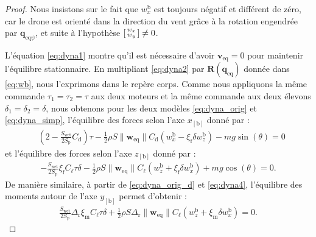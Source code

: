 \begin{proof}
        Nous insistons sur le fait que $w_{x}^{\text{b}}$ est toujours négatif et différent de zéro, car le drone est orienté dans la direction du vent grâce à la rotation engendrée par $ \boldsymbol{q}_{\mathrm{eq}\psi}$, et suite à l'hypothèse $\left[ \begin{smallmatrix}w_x \\ w_y \end{smallmatrix} \right] \neq 0$.
    
        L'équation \eqref{eq:dyna1} montre qu'il est nécessaire d'avoir $\boldsymbol{v}_{\text{eq}} = 0$ pour maintenir l'équilibre stationnaire. En multipliant \eqref{eq:dyna2} par $\boldsymbol{R}(\boldsymbol{q}_{\text{eq}})$ donnée dans  \eqref{eq:wb}, nous l'exprimons dans le repère corps.
        Comme nous appliquons la même commande $\tau_{1} = \tau_{2} = \tau $ aux deux moteurs et la même commande aux deux élevons $\delta_{1} = \delta_{2} = \delta$, nous obtenons pour les deux modèles \eqref{eq:dyna_orig} et \eqref{eq:dyna_simp}, l'équilibre des forces selon l'axe $x_{[\text{b}]}$ donné par :
        \begin{align}
            & (2-\frac{S_{\text{wet}}}{2S_{\text{p}}} C_{\text{d}})\tau - \frac{1}{2}\rho S \lVert \boldsymbol{w}_{\mathrm{eq}} \rVert C_{\text{d}} \left(w_{x}^{\text{b}} - \xi_{\text{f}} \delta w_{z}^{\text{b}} \right) - mg \sin(\theta) = 0 \label{eq:forcex}
        \end{align}
        et l'équilibre des forces selon l'axe $z_{[\text{b}]}$ donné par : 
        \begin{align}\label{eq:forcez}
            - \frac{S_{\text{wet}}}{2S_{\text{p}}}\xi_{\text{f}} C_{\ell} \tau \delta - \frac{1}{2}\rho S \lVert \boldsymbol{w}_{\mathrm{eq}} \rVert C_{\ell} \left(w_{z}^{\text{b}} + \xi_{\text{f}} \delta w_{x}^{\text{b}} \right) + mg \cos(\theta) = 0.
        \end{align}
        De manière similaire, à partir de \eqref{eq:dyna_orig_d} et \eqref{eq:dyna4}, l'équilibre des moments autour de l'axe $y_{[\text{b}]}$ permet d'obtenir : 
        \begin{align}\label{eq:momenty}
            \frac{S_{\text{wet}}}{2S_{\text{p}}}  \Delta_{\text{r}} \xi_{\text{m}} C_{\ell} \tau \delta + \frac{1}{2}\rho S \Delta_{\text{r}} \lVert \boldsymbol{w}_{\mathrm{eq}} \rVert C_{\ell} \left(w_{z}^{\text{b}} + \xi_{\text{m}} \delta w_{x}^{\text{b}} \right) = 0.
        \end{align}
        

\end{proof}
